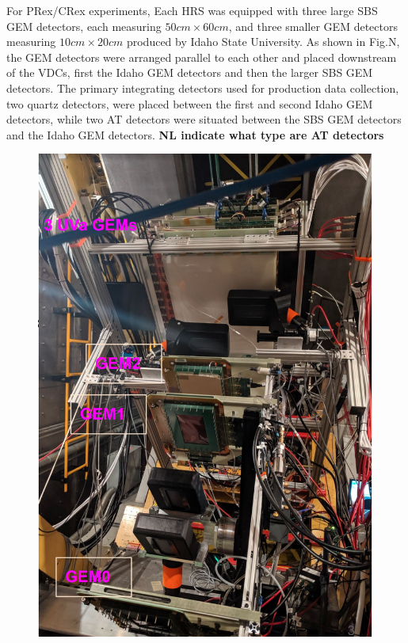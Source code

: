 For PRex/CRex experiments, Each HRS was  equipped with three large SBS GEM detectors, each measuring $50 cm \times 60 cm$, and three smaller GEM detectors measuring $10 cm \times 20 cm$ produced by Idaho State University. As shown  in  Fig.N, the GEM detectors were arranged parallel to each other and placed downstream of  the VDCs, first the Idaho GEM detectors and then  the larger SBS GEM detectors. The primary integrating detectors used for production data collection, two quartz detectors,  were placed between the first and second Idaho GEM detectors, while two AT detectors were situated between the SBS GEM detectors and the Idaho GEM detectors. {\bf NL indicate what type are AT detectors}


\begin{figure}[!htbp]
  \centering
  \begin{minipage}[b]{0.45\textwidth}
    \includegraphics[width=\textwidth]{images/chap5/gem_in_apparatus_photo.png}

\end{minipage}
\end{figure}
